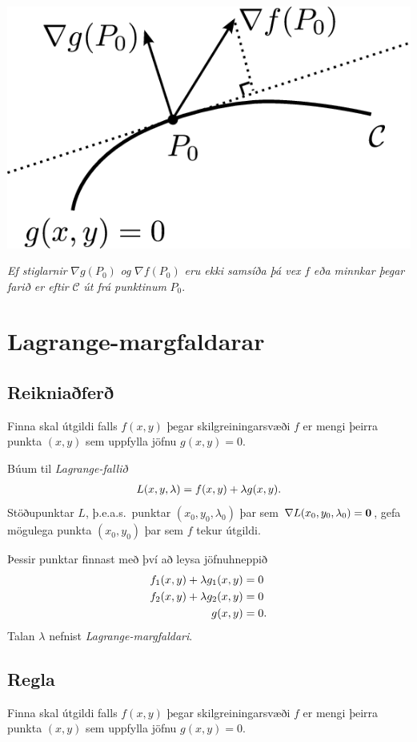 \documentclass[a4paper,10pt,icelandic]{sphinxmanual}
\begin{document}
{\hfill\includegraphics[width=0.400\linewidth]{lagrange1.png}\hfill}

\emph{Ef stiglarnir} \(\nabla g(P_0)\) \emph{og} \(\nabla f(P_0)\) \emph{eru ekki
samsíða þá vex} \(f\) \emph{eða minnkar þegar farið er eftir}
\(\mathcal{C}\) \emph{út frá punktinum} \(P_0\).


\section{Lagrange-margfaldarar}
\label{Kafli3:lagrange-margfaldarar}

\subsection{Reikniaðferð}
\label{Kafli3:reikniafer}
Finna skal útgildi falls \(f(x,y)\) þegar skilgreiningarsvæði
\(f\) er mengi þeirra punkta \((x,y)\) sem uppfylla jöfnu
\(g(x,y)=0\).

Búum til \emph{Lagrange-fallið}
\begin{gather}
\begin{split}L(x,y,\lambda)=f(x,y)+\lambda g(x,y).\end{split}\notag
\end{gather}
Stöðupunktar \(L\), þ.e.a.s. punktar \((x_0,y_0,\lambda_0)\) þar
sem \(\nabla L(x_0,y_0,\lambda_0)=\mbox{${\bf 0}$}\), gefa mögulega
punkta \((x_0,y_0)\) þar sem \(f\) tekur útgildi.

Þessir punktar finnast með því að leysa jöfnuhneppið
\begin{gather}
\begin{split}\begin{aligned}
f_1(x,y)+\lambda g_1(x,y)&=0\\
f_2(x,y)+\lambda g_2(x,y)&=0\\
g(x,y)&=0.\end{aligned}\end{split}\notag
\end{gather}
Talan \(\lambda\) nefnist \emph{Lagrange-margfaldari}.


\subsection{Regla}
\label{Kafli3:id13}
Finna skal útgildi falls \(f(x,y)\) þegar skilgreiningarsvæði
\(f\) er mengi þeirra punkta \((x,y)\) sem uppfylla jöfnu
\(g(x,y)=0\).
\end{document}
